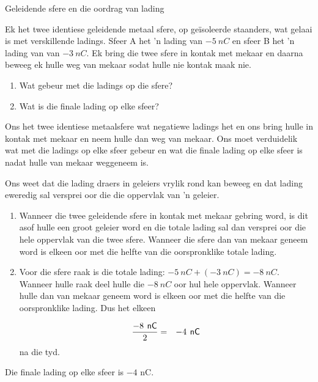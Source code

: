 \begin{wex}{Geleidende sfere en die oordrag van lading}{Ek het twee identiese geleidende metaal sfere, op ge\"isoleerde staanders, wat gelaai is met verskillende ladings. Sfeer A het 'n lading van $-5~nC$ en sfeer B het 'n lading van van $-3~nC$. Ek bring die twee sfere in kontak met mekaar en daarna beweeg ek hulle weg van mekaar sodat hulle nie kontak maak nie.\\
\begin{minipage}{\textwidth}
\vspace*{1em}
\begin{enumerate}[itemsep=5pt, label=\textbf{\arabic*}.] 
    \item Wat gebeur met die ladings op die sfere?
    \item Wat is die finale lading op elke sfeer?
\end{enumerate}
\end{minipage}
}{

Ons het twee identiese metaalsfere wat negatiewe ladings het en ons bring hulle in kontak met mekaar en neem hulle dan weg van mekaar. Ons moet verduidelik wat met die ladings op elke sfeer gebeur en wat die finale lading op elke sfeer is nadat hulle van mekaar weggeneem is.
      

Ons weet dat die lading draers in geleiers vrylik rond kan beweeg en dat lading eweredig sal versprei oor die die oppervlak van 'n geleier. \par
      
\begin{minipage}{0.75\textwidth}
\begin{enumerate}[noitemsep, label=\textbf{\alph*}. ] 
    \item  Wanneer die twee geleidende sfere in kontak met mekaar gebring word, is dit asof hulle een groot geleier word en die totale lading sal dan versprei oor die hele oppervlak van die twee sfere. Wanneer die sfere dan van mekaar geneem word is elkeen oor met die helfte van die oorspronklike totale lading.

    \item Voor die sfere raak is die totale lading: $-5~nC + (-3~nC) = -8~nC$. Wanneer hulle raak deel hulle die $-8~nC$ oor hul hele oppervlak. Wanneer hulle dan van mekaar geneem word is elkeen oor met die helfte van die oorspronklike lading. Dus het elkeen
    
\begin{eqnarray*}
    \frac{-8\phantom{\rule{4pt}{0ex}}\mathsf{nC}}{2}& =& -4\phantom{\rule{4pt}{0ex}}\mathsf{nC}
      \end{eqnarray*}
na die tyd.
\end{enumerate}
\end{minipage}

Die finale lading op elke sfeer is $-4$ nC.

}
\end{wex}

